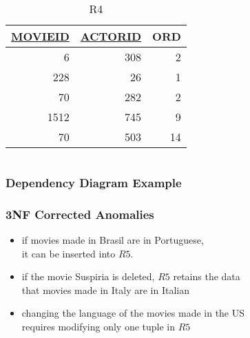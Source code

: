 \documentclass[dvipsnames]{beamer}
\begin{document}
\begin{frame}
\begin{example}
\begin{columns}[t]
      \begin{tiny}
      \begin{table}
        \caption{R4}
        \begin{tabular}{|r|r|r|}\hline
\underline{MOVIEID} & \underline{ACTORID} & ORD\\\hline\hline
   6 & 308 &  2\\\hline
 228 &  26 &  1\\\hline
  70 & 282 &  2\\\hline
1512 & 745 &  9\\\hline
  70 & 503 & 14\\\hline
        \end{tabular}
      \end{table}
      \end{tiny}
    \end{columns}
  \end{example}
\end{frame}

\begin{frame}
  \frametitle{Dependency Diagram Example}

  \begin{example}
    \begin{center}
    \end{center}
  \end{example}
 \end{frame}

\begin{frame}
  \frametitle{3NF Corrected Anomalies}

  \begin{example}
    \begin{itemize}
      \item if movies made in Brasil are in Portuguese,\\
	it can be inserted into $R5$.

      \pause
      \item if the movie Suspiria is deleted, $R5$ retains the data\\
        that movies made in Italy are in Italian

      \pause
      \item changing the language of the movies made in the US\\
	requires modifying only one tuple in $R5$
    \end{itemize}
  \end{example}
\end{frame}
\end{document}
